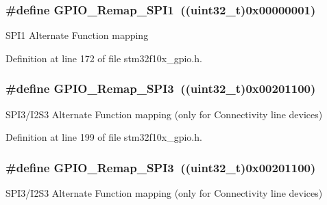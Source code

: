 \subsubsection[{\texorpdfstring{G\+P\+I\+O\+\_\+\+Remap\+\_\+\+S\+P\+I1}{GPIO_Remap_SPI1}}]{\setlength{\rightskip}{0pt plus 5cm}\#define G\+P\+I\+O\+\_\+\+Remap\+\_\+\+S\+P\+I1~(({\bf uint32\+\_\+t})0x00000001)}\hypertarget{group___g_p_i_o___remap__define_ga58b02a04a6041954c6e99e681716ab4c}{}\label{group___g_p_i_o___remap__define_ga58b02a04a6041954c6e99e681716ab4c}
S\+P\+I1 Alternate Function mapping 

Definition at line 172 of file stm32f10x\+\_\+gpio.\+h.

\subsubsection[{\texorpdfstring{G\+P\+I\+O\+\_\+\+Remap\+\_\+\+S\+P\+I3}{GPIO_Remap_SPI3}}]{\setlength{\rightskip}{0pt plus 5cm}\#define G\+P\+I\+O\+\_\+\+Remap\+\_\+\+S\+P\+I3~(({\bf uint32\+\_\+t})0x00201100)}\hypertarget{group___g_p_i_o___remap__define_gac7fd74244a9d53ca02cc86bb6543a689}{}\label{group___g_p_i_o___remap__define_gac7fd74244a9d53ca02cc86bb6543a689}
S\+P\+I3/\+I2\+S3 Alternate Function mapping (only for Connectivity line devices) 

Definition at line 199 of file stm32f10x\+\_\+gpio.\+h.

\subsubsection[{\texorpdfstring{G\+P\+I\+O\+\_\+\+Remap\+\_\+\+S\+P\+I3}{GPIO_Remap_SPI3}}]{\setlength{\rightskip}{0pt plus 5cm}\#define G\+P\+I\+O\+\_\+\+Remap\+\_\+\+S\+P\+I3~(({\bf uint32\+\_\+t})0x00201100)}\hypertarget{group___g_p_i_o___remap__define_gac7fd74244a9d53ca02cc86bb6543a689}{}\label{group___g_p_i_o___remap__define_gac7fd74244a9d53ca02cc86bb6543a689}
S\+P\+I3/\+I2\+S3 Alternate Function mapping (only for Connectivity line devices) 

